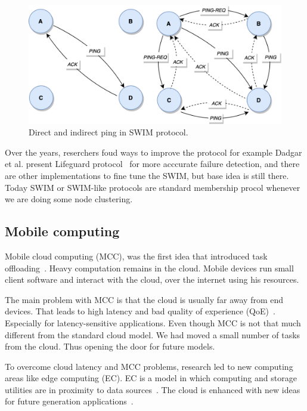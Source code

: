 \begin{figure}[H]
	\begin{center}
		\includegraphics[scale=0.7]{images/Figure15.png}
	\end{center}
	\vspace{-0.6cm}
	\caption{Direct and indirect ping in SWIM protocol.}
	\label{fig:fig15}
\end{figure}

Over the years, reserchers foud ways to improve the protocol for example Dadgar et al. present Lifeguard protocol~\cite{DadgarPC18} for more
acccurate failure detection, and there are other implementations to fine tune the SWIM, but base idea is still there. Today SWIM or SWIM-like protocols are standard membership procol whenever we are doing some node clustering.
%
%
\subsection{Mobile computing}\label{sec:mobile_computing}
%
Mobile cloud computing (MCC), was the first idea that introduced task offloading~\cite{FernandoLR13, LinLJL19}. Heavy computation remains in the cloud. Mobile devices run small client software and interact with the cloud, over the internet using his resources. 

The main problem with MCC is that the cloud is usually far away from end devices. That leads to high latency and bad quality of experience (QoE)~\cite{LinLJL19}. Especially for latency-sensitive applications. Even though MCC is not that much different from the standard cloud model. We had moved a small number of tasks from the cloud. Thus opening the door for future models.

To overcome cloud latency and MCC problems, research led to new computing areas like edge computing (EC). EC is a model in which computing and storage utilities are in proximity to data sources~\cite{Satyanarayanan17}. The cloud is enhanced with new ideas for future generation applications~\cite{NingLSY20}. 

